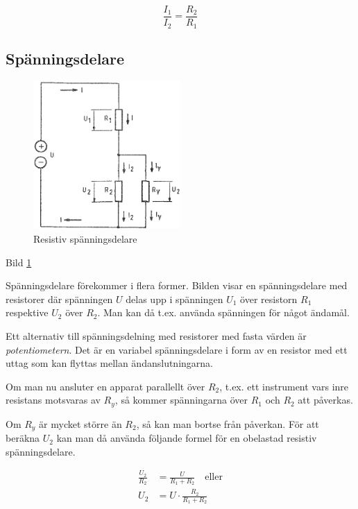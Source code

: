 \[\frac{I_1}{I_2} = \frac{R_2}{R_1}\]

\subsection{Spänningsdelare}

\begin{figure}
\includegraphics[width=0.5\textwidth]{images/cropped_pdfs/bild_2_3-03.pdf}
\caption{Resistiv spänningsdelare}
\label{fig:BildII3-03}
\end{figure}

Bild \ref{fig:BildII3-03}

Spänningsdelare förekommer i flera former. Bilden visar en spänningsdelare med
resistorer där spänningen \(U\) delas upp i spänningen \(U_1\) över resistorn
\(R_1\) respektive \(U_2\) över \(R_2\). Man kan då t.ex. använda spänningen för
något ändamål.

Ett alternativ till spänningsdelning med resistorer med fasta värden är
\emph{potentiometern}. Det är en variabel spänningsdelare i form av en resistor
med ett uttag som kan flyttas mellan ändanslutningarna.

Om man nu ansluter en apparat parallellt över \(R_2\), t.ex. ett instrument
vars inre resistans motsvaras av \(R_y\), så kommer spänningarna över \(R_1\)
och \(R_2\) att påverkas.

Om \(R_y\) är mycket större än \(R_2\), så kan man bortse från påverkan.
För att beräkna \(U_2\) kan man då använda följande formel för en obelastad
resistiv spänningsdelare.

\begin{align*}
\frac{U_2}{R_2} &= \frac{U}{R_1 + R_2} \quad \text{eller} \\
U_2 &= U \cdot \frac{R_2}{R_1 + R_2}
\end{align*}

